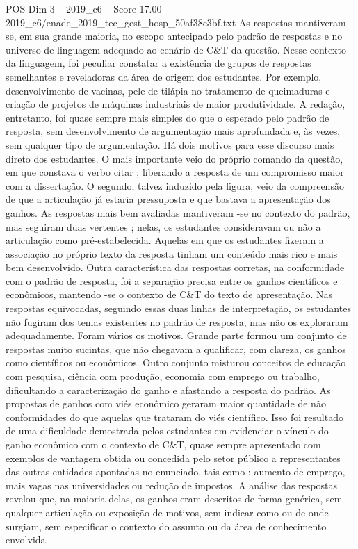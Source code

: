 \begin{textsample}{POS Dim 3 – 2019\_c6 – Score 17.00 – 2019\_c6/enade\_2019\_tec\_gest\_hosp\_50af38c3bf.txt}
As respostas mantiveram -se, em sua grande maioria, no escopo antecipado pelo padrão de respostas e no universo de linguagem adequado ao cenário de C\&T da questão.
Nesse contexto da linguagem, foi peculiar constatar a existência de grupos de respostas semelhantes e reveladoras da área de origem dos estudantes.
Por exemplo, desenvolvimento de vacinas, pele de tilápia no tratamento de queimaduras e criação de projetos de máquinas industriais de maior produtividade.
A redação, entretanto, foi quase sempre mais simples do que o esperado pelo padrão de resposta, sem desenvolvimento de argumentação mais aprofundada e, às vezes, sem qualquer tipo de argumentação.
Há dois motivos para esse discurso mais direto dos estudantes.
O mais importante veio do próprio comando da questão, em que constava o verbo citar ; liberando a resposta de um compromisso maior com a dissertação.
O segundo, talvez induzido pela figura, veio da compreensão de que a articulação já estaria pressuposta e que bastava a apresentação dos ganhos.
As respostas mais bem avaliadas mantiveram -se no contexto do padrão, mas seguiram duas vertentes ; nelas, os estudantes consideravam ou não a articulação como pré-estabelecida.
Aquelas em que os estudantes fizeram a associação no próprio texto da resposta tinham um conteúdo mais rico e mais bem desenvolvido.
Outra característica das respostas corretas, na conformidade com o padrão de resposta, foi a separação precisa entre os ganhos científicos e econômicos, mantendo -se o contexto de C\&T do texto de apresentação.
Nas respostas equivocadas, seguindo essas duas linhas de interpretação, os estudantes não fugiram dos temas existentes no padrão de resposta, mas não os exploraram adequadamente.
Foram vários os motivos.
Grande parte formou um conjunto de respostas muito sucintas, que não chegavam a qualificar, com clareza, os ganhos como científicos ou econômicos.
Outro conjunto misturou conceitos de educação com pesquisa, ciência com produção, economia com emprego ou trabalho, dificultando a caracterização do ganho e afastando a resposta do padrão.
As propostas de ganhos com viés econômico geraram maior quantidade de não conformidades do que aquelas que trataram do viés científico.
Isso foi resultado de uma dificuldade demostrada pelos estudantes em evidenciar o vínculo do ganho econômico com o contexto de C\&T, quase sempre apresentado com exemplos de vantagem obtida ou concedida pelo setor público a representantes das outras entidades apontadas no enunciado, tais como : aumento de emprego, mais vagas nas universidades ou redução de impostos.
A análise das respostas revelou que, na maioria delas, os ganhos eram descritos de forma genérica, sem qualquer articulação ou exposição de motivos, sem indicar como ou de onde surgiam, sem especificar o contexto do assunto ou da área de conhecimento envolvida.

\end{textsample}
